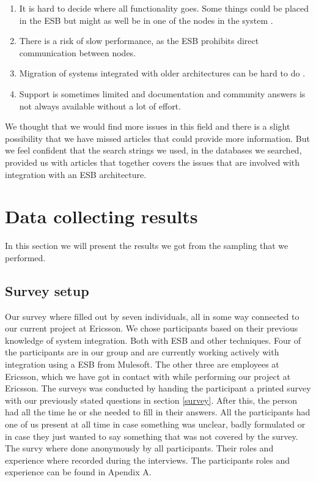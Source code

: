 \documentclass{llncs}
\begin{document}
\begin{enumerate}
\item It is hard to decide where all functionality goes. Some things could be placed in the ESB but might as well be in one of the nodes in the system \cite{ortiz07}.
\item There is a risk of slow performance, as the ESB prohibits direct communication between nodes.
\item Migration of systems integrated with older architectures can be hard to do \cite{ortiz07}.
\item Support is sometimes limited and documentation and community answers is not always available without a lot of effort.
\end{enumerate}

We thought that we would find more issues in this field and there is a slight possibility that we have missed articles that could provide more information. But we feel confident that the search strings we used, in the databases we searched, provided us with articles that together covers the issues that are involved with integration with an ESB architecture.

\section{Data collecting results}
In this section we will present the results we got from the sampling that we performed.
\subsection{Survey setup}

Our survey where filled out by seven individuals, all in some way connected to our current project at Ericsson. We chose participants based on their previous knowledge of system integration. Both with ESB and other techniques. Four of the participants are in our group and are currently working actively with integration using a ESB from Mulesoft. The other three are employees at Ericsson, which we have got in contact with while performing our project at Ericsson.
The surveys was conducted by handing the participant a printed survey with our previously stated questions  in section \ref{survey}. After this, the person had all the time he or she needed to fill in their answers.
All the participants had one of us present at all time in case something was unclear, badly formulated or in case they just wanted to say something that was not covered by the survey. The survy where done anonymously by all participants. Their roles and experience where recorded during the interviews. The participants roles and experience can be found in Apendix A.
\end{document}
